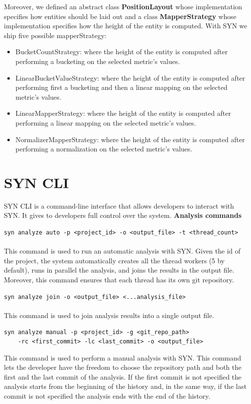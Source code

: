 Moreover, we defined an abstract class \textbf{PositionLayout} whose implementation specifies how entities should be laid out and a class \textbf{MapperStrategy} whose implementation specifies how the height of the entity is computed. With SYN we ship five possible mapperStrategy:
\begin{itemize}
    \item BucketCountStrategy: where the height of the entity is computed after performing a bucketing on the selected metric's values. 
    \item LinearBucketValueStrategy: where the height of the entity is computed after performing first a bucketing and then a linear mapping on the selected metric's values. 
    \item LinearMapperStrategy: where the height of the entity is computed after performing a linear mapping on the selected metric's values. 
    \item NormalizerMapperStrategy: where the height of the entity is computed after performing a normalization on the selected metric's values. 
\end{itemize}



\section{SYN CLI}
SYN CLI is a command-line interface that allows developers to interact with SYN. It gives to developers full control over the system.
\bigbreak
\textbf{Analysis commands}
\bigbreak

\lstinline{syn analyze auto -p <project_id> -o <output_file> -t <thread_count>}\\
\\
This command is used to run an automatic analysis with SYN. 
Given the id of the project, the system automatically creates all the thread workers (5 by default), runs in parallel the analysis, and joins the results in the output file. 
Moreover, this command ensures that each thread has its own git repository. 
\bigbreak

\lstinline{syn analyze join -o <output_file> <...analysis_file>}\\
\\
This command is used to join analysis results into a single output file.
\bigbreak
\begin{lstlisting}
syn analyze manual -p <project_id> -g <git_repo_path>
    -rc <first_commit> -lc <last_commit> -o <output_file>
\end{lstlisting}
\bigbreak
This command is used to perform a manual analysis with SYN. This command lets the developer have the freedom to choose the repository path and both the first and the last commit of the analysis. 
If the first commit is not specified the analysis starts from the beginning of the history and, in the same way, if the last commit is not specified the analysis ends with the end of the history. 
\bigbreak

